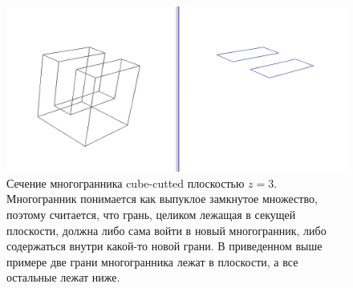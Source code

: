\documentclass[a4paper,12pt, titlepage]{article}
\begin{document}
	\begin{flushleft}
		\begin{figure}[h]
		    \includegraphics[width=15cm]{cube-cutted/cube-cutted-3.png}
		    \caption{Сечение многогранника cube-cutted плоскостью $z = 3$. Многогранник понимается как выпуклое
		замкнутое множество, поэтому считается, что грань, целиком лежащая в секущей плоскости,
		должна либо сама войти в новый многогранник, либо содержаться внутри какой-то новой грани.
		В приведенном выше примере две грани многогранника лежат в плоскости, а все остальные лежат
		ниже.}
		    \label{cube-cutted-3}
		\end{figure}
	\end{flushleft}

\newpage
\end{document}

